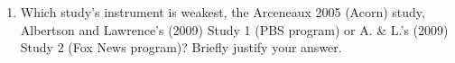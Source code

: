 \documentclass{article}
\begin{document}
\begin{enumerate}
\begin{enumerate}
  \item Conversely, explain how for a study population of Round 2 respondents,
       random assignment at round 1 plus the additional assumption that $r_i(1)
       = r_i(0)$ for all $i$ alleviates this threat to inference.
  \end{enumerate}
\item Which study's instrument is weakest, the Arceneaux 2005 (Acorn) study,
    Albertson and Lawrence's (2009) Study 1 (PBS program) or A. \& L.'s (2009)
    Study 2 (Fox News program)? Briefly justify your answer.
\end{enumerate}
\end{document}
